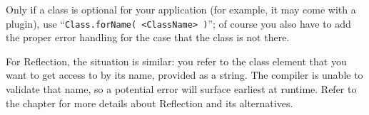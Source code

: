Only if a class is optional for your application (for example, it may come with a plugin), use “\lstinline|Class.forName( <ClassName> )|”; of course you also have to add the proper error handling for the case that the class is not there.

For Reflection, the situation is similar: you refer to the class element that you want to get access to by its name, provided as a string. The compiler is unable to validate that name, so a potential error will surface earliest at runtime. Refer to the chapter  for more details about Reflection and its alternatives.


